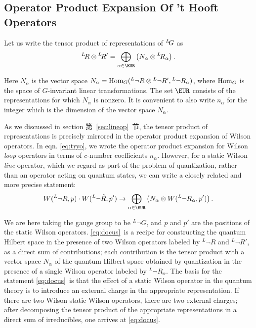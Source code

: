 
\subsection{Operator Product Expansion Of 't Hooft Operators}

\label{sec:opprod}

Let us write the tensor product of representations of $^L\negthinspace G$ as
\setcounter{equation}{20}
\begin{equation}\label{eq:yurgo}
^L\negthinspace R\otimes {}^L\negthinspace
R'=\bigoplus_{\alpha\in \EUR}\left(N_\alpha \otimes{}^L\negthinspace R_\alpha\right).
\end{equation}

Here $N_\alpha$ is the vector space $N_\alpha={\rm Hom}_G({}^L\neg R\otimes {}^L\neg{R'},{}^L\neg
R_\alpha)$, where ${\rm Hom}_G$ is the space of $G$-invariant linear transformations. The set $\EUR$
consists of
 the representations for which $N_\alpha$ is nonzero.
It is
convenient to also write $n_\alpha$ for the integer which is the dimension of the vector space
$N_\alpha$.

As we discussed in section 第~\ref{sec:lineop}~节, the tensor product of representations is precisely mirrored
in the operator product expansion of Wilson operators.  In eqn.  \eqref{eq:tryo}, we wrote the operator
product expansion for Wilson {\it loop} operators in terms of $c$-number coefficients $n_\alpha$.
However, for a static Wilson {\it line} operator, which we regard as part of the problem
of quantization, rather than an operator acting on quantum states, we can write a closely related and
more precise statement:
\setcounter{equation}{21}
\begin{equation}\label{eq:docus}
W({}^L\neg R,p)\cdot W({}^L\neg\tilde R,p')\to
\bigoplus_{\alpha\in\EUR}\left(N_\alpha\otimes W({}^L\neg
R_\alpha,p')\right).
\end{equation}

We are here taking the gauge group to be $^L\neg G$, and $p$ and $p'$ are the positions of the static
Wilson operators.
\eqref{eq:docus}\ is a recipe for constructing the quantum Hilbert space in the presence
of two Wilson operators labeled by $^L\neg R$ and $^L\neg R'$, as a direct sum of contributions;
each contribution is the tensor product with a vector space $N_\alpha$ of the quantum Hilbert space
obtained by quantization in the presence of a single Wilson operator labeled by $^L\neg R_\alpha$.  The basis
for the statement \eqref{eq:docus}\ is that the effect of a static Wilson operator in the quantum theory is
to introduce an external charge in the appropriate representation.  If there are two Wilson static
Wilson operators, there are  two external charges; after decomposing the tensor product of the
appropriate representations in a direct sum of irreducibles, one arrives at \eqref{eq:docus}.

